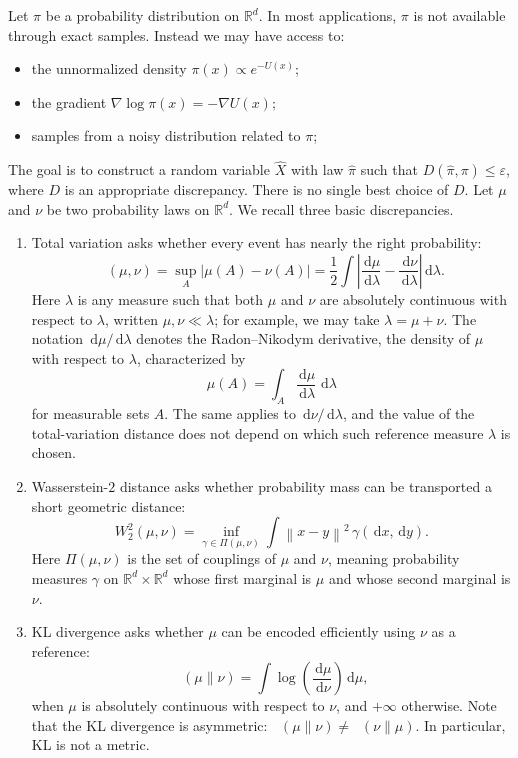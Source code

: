 \documentclass[10pt,a4paper]{amsart}
\numberwithin{equation}{section}
\DeclareMathOperator{\KL}{D_{\mathsf{KL}}}
\DeclareMathOperator{\TV}{D_{\mathsf{TV}}}
\newcommand{\R}{\mathbb{R}}
\newcommand{\dd}{\,\mathrm{d}}
\newcommand{\wh}[1]{\widehat{#1}}
\newcommand{\deltaerr}{\varepsilon}
\newcommand{\norm}[1]{\left\lVert #1 \right\rVert}
\newcommand{\abs}[1]{\left\lvert #1 \right\rvert}
\begin{document}
Let $\pi$ be a probability distribution on $\R^d$.  In most applications,
$\pi$ is not available through exact samples.  Instead we may have access to:
\begin{itemize}
    \item the unnormalized density $\pi(x)\propto e^{-U(x)}$;
    \item the gradient $\nabla\log\pi(x)=-\nabla U(x)$;
    \item samples from a noisy distribution related to $\pi$;
\end{itemize}
The goal is to construct a random variable $\wh X$ with law $\wh\pi$ such that
$D(\wh\pi,\pi)\leq \deltaerr$, where $D$ is an appropriate discrepancy.  There
is no single best choice of $D$. Let $\mu$ and $\nu$ be two probability laws on $\R^d$.
We recall three basic discrepancies.
\begin{enumerate}
\item Total variation asks whether every event has nearly the right
probability:
\[
    \TV(\mu,\nu)=\sup_A\abs{\mu(A)-\nu(A)}
    =\frac12\int\abs{\frac{\dd\mu}{\dd\lambda}
    -\frac{\dd\nu}{\dd\lambda}}\dd\lambda.
\]
Here $\lambda$ is any measure such that both $\mu$ and $\nu$ are absolutely
continuous with respect to $\lambda$, written $\mu,\nu\ll\lambda$; for example,
we may take $\lambda=\mu+\nu$.  The notation $\dd\mu/\dd\lambda$ denotes the
Radon--Nikodym derivative, the density of $\mu$ with respect to $\lambda$,
characterized by
\[
    \mu(A)=\int_A \frac{\dd\mu}{\dd\lambda}\,\dd\lambda
\]
for measurable sets $A$.  The same applies to $\dd\nu/\dd\lambda$, and the
value of the total-variation distance does not depend on which such reference
measure $\lambda$ is chosen.
\item Wasserstein-$2$ distance asks whether probability mass can be
transported a short geometric distance:
\[
    W_2^2(\mu,\nu)=\inf_{\gamma\in\Pi(\mu,\nu)}
    \int \norm{x-y}^2\,\gamma(\dd x,\dd y).
\]
Here $\Pi(\mu,\nu)$ is the set of couplings of $\mu$ and $\nu$, meaning
probability measures $\gamma$ on $\R^d\times\R^d$ whose first marginal is
$\mu$ and whose second marginal is $\nu$.
\item KL divergence asks whether $\mu$ can be encoded efficiently using $\nu$
as a reference:
\[
    \KL(\mu\|\nu)
    =
    \int \log\!\left(\frac{\dd\mu}{\dd\nu}\right)\dd\mu,
\]
when $\mu$ is absolutely continuous with respect to $\nu$, and
$+\infty$ otherwise.  Note that the KL divergence is asymmetric:
$\KL(\mu\|\nu) \neq \KL(\nu\|\mu)$.  In particular, KL is not a metric.
\end{enumerate}
\end{document}
